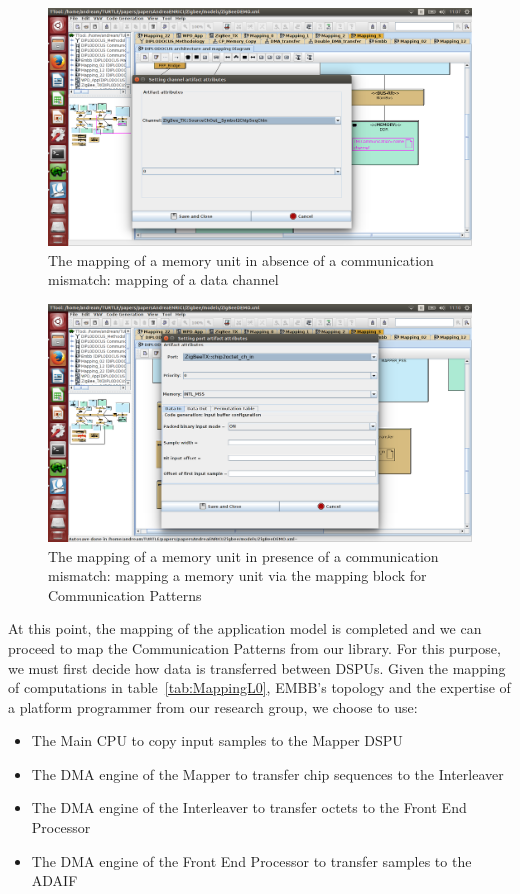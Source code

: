 \documentclass{llncs}
\newcommand{\screenshotsize}{1.0\textwidth}
\begin{document}
%
\begin{figure}[htbp]
	\centering
	\includegraphics[width=\screenshotsize]{figures/screenshot/MapMemory1.png}
	\caption{The mapping of a memory unit in absence of a communication mismatch: mapping of a data channel}
	\label{fig:MapMemory1}
\end{figure}
%
\begin{figure}[htbp]
	\centering
	\includegraphics[width=\screenshotsize]{figures/screenshot/MapMemory2.png}
	\caption{The mapping of a memory unit in presence of a communication mismatch: mapping a memory unit via the
	mapping block for Communication Patterns}
	\label{fig:MapMemory2}
\end{figure}
%
At this point, the mapping of the application model is completed and we can proceed to map the Communication Patterns
from our library. For this purpose, we must first decide how data is transferred between DSPUs. Given the mapping of
computations in table~\ref{tab:MappingL0}, EMBB's topology and the expertise of a platform programmer from our research
group, we choose to use:
%
\begin{itemize}
	\item The Main CPU to copy input samples to the Mapper DSPU
	\item The DMA engine of the Mapper to transfer chip sequences to the Interleaver
	\item The DMA engine of the Interleaver to transfer octets to the Front End Processor
	\item The DMA engine of the Front End Processor to transfer samples to the ADAIF
\end{itemize}
\end{document}
